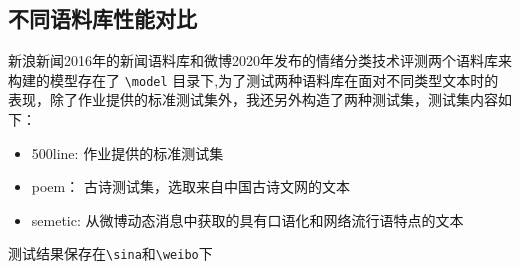 \documentclass{article}
\begin{document}
\begin{spacing}{1.1}
\begin{itemize}
	
	
\end{itemize}
\subsection{不同语料库性能对比}
\hspace{1.4em}
新浪新闻2016年的新闻语料库和微博2020年发布的情绪分类技术评测两个语料库来构建的模型存在了 \verb|\model| 目录下,为了测试两种语料库在面对不同类型文本时的表现，除了作业提供的标准测试集外，我还另外构造了两种测试集，测试集内容如下：
\begin{itemize}
	\item 500line: 作业提供的标准测试集
	\item poem： 古诗测试集，选取来自中国古诗文网的文本
	\item semetic: 从微博动态消息中获取的具有口语化和网络流行语特点的文本
	
\end{itemize}
测试结果保存在\verb|\sina|和\verb|\weibo|下


\end{spacing}
\end{document}
